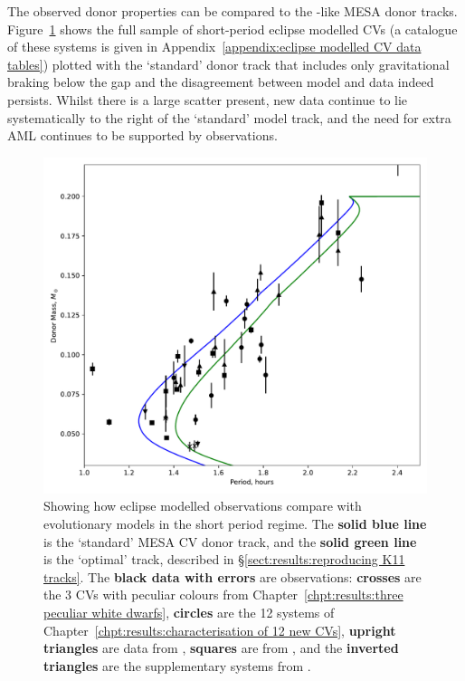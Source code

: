 The observed donor properties can be compared to the \citet{knigge11}-like MESA donor tracks. Figure~\ref{fig:discussion:donor model with eclipsers plotted} shows the full sample of short-period eclipse modelled CVs (a catalogue of these systems is given in Appendix~\ref{appendix:eclipse modelled CV data tables}) plotted with the `standard' donor track that includes only gravitational braking below the gap and the disagreement between model and data indeed persists. Whilst there is a large scatter present, new data continue to lie systematically to the right of the `standard' model track, and the need for extra AML continues to be supported by observations.
\begin{figure}
    \centering
    \includegraphics[width=\textwidth]{figures/results/Mdot/K11_donor_track_with_eclipse_modelled_data.pdf}
    \caption{Showing how eclipse modelled observations compare with evolutionary models in the short period regime. The {\bf solid blue line} is the `standard' MESA CV donor track, and the {\bf solid green line} is the `optimal' track, described in \S\ref{sect:results:reproducing K11 tracks}. The {\bf black data with errors} are observations: {\bf crosses} are the 3 CVs with peculiar colours from Chapter~\ref{chpt:results:three peculiar white dwarfs}, {\bf circles} are the 12 systems of Chapter~\ref{chpt:results:characterisation of 12 new CVs}, {\bf upright triangles} are data from \citet{McAllister2019}, {\bf squares} are from \citet{Savoury2011}, and the {\bf inverted triangles} are the supplementary systems from \citet{copperwheat2010,mcallister2015,mcallister2017,mcallister2017b}.}
    \label{fig:discussion:donor model with eclipsers plotted}
\end{figure}



